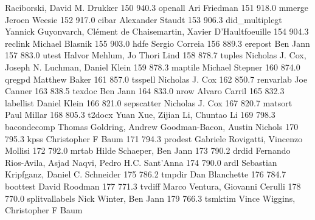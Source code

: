                                    Raciborski, David M. Drukker            
   150    940.3    openall       Ari Friedman                            
   151    918.0    mmerge        Jeroen Weesie                           
   152    917.0    cibar         Alexander Staudt                        
   153    906.3    did_multiplegt  Yannick Guyonvarch, Clément de         
                                   Chaisemartin, Xavier D'Haultfoeuille    
   154    904.3    reclink       Michael Blasnik                         
   155    903.0    hdfe          Sergio Correia                          
   156    889.3    erepost       Ben Jann                                
   157    883.0    utest         Halvor Mehlum, Jo Thori Lind            
   158    878.7    tuples        Nicholas J. Cox, Joseph N. Luchman,     
                                   Daniel Klein                            
   159    878.3    maptile       Michael Stepner                         
   160    874.0    qregpd        Matthew Baker                           
   161    857.0    tsspell       Nicholas J. Cox                         
   162    850.7    renvarlab     Joe Canner                              
   163    838.5    texdoc        Ben Jann                                
   164    833.0    nrow          Alvaro Carril                           
   165    832.3    labellist     Daniel Klein                            
   166    821.0    sepscatter    Nicholas J. Cox                         
   167    820.7    matsort       Paul Millar                             
   168    805.3    t2docx        Yuan Xue, Zijian Li, Chuntao Li         
   169    798.3    bacondecomp   Thomas Goldring, Andrew Goodman-Bacon,  
                                   Austin Nichols                          
   170    795.3    kpss          Christopher F Baum                      
   171    794.3    prodest       Gabriele Rovigatti, Vincenzo Mollisi    
   172    792.0    mrtab         Hilde Schaeper, Ben Jann                
   173    790.2    drdid         Fernando Rios-Avila, Asjad Naqvi, Pedro 
                                   H.C. Sant'Anna                          
   174    790.0    ardl          Sebastian Kripfganz, Daniel C. Schneider
   175    786.2    tmpdir        Dan Blanchette                          
   176    784.7    boottest      David Roodman                           
   177    771.3    tvdiff        Marco Ventura, Giovanni Cerulli         
   178    770.0    splitvallabels  Nick Winter, Ben Jann                   
   179    766.3    tsmktim       Vince Wiggins, Christopher F Baum       

